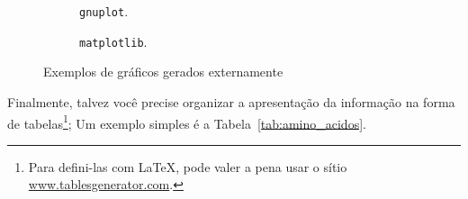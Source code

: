 \begin{figure}
  \centering
  \begin{subfigure}[b]{.45\textwidth}
    \caption{\texttt{gnuplot}.\label{fig:gnuplot}}
  \end{subfigure}
  \begin{subfigure}[b]{.5\textwidth}
    
    \caption{\texttt{matplotlib}.\label{fig:matplotlib}}
  \end{subfigure}
  \caption{Exemplos de gráficos gerados externamente}\label{fig:graficos}
\end{figure}

Finalmente, talvez você precise organizar a apresentação da informação na forma de
tabelas\footnote{Para defini-las com \LaTeX{}, pode valer a pena usar o
sítio \url{www.tablesgenerator.com}.}; Um exemplo simples é a Tabela~\ref{tab:amino_acidos}.


